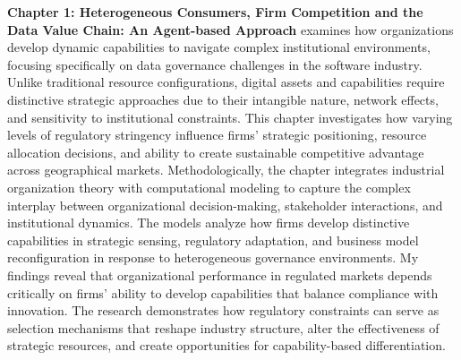 \documentclass[11pt]{article}
\begin{document}
\textbf{Chapter 1: Heterogeneous Consumers, Firm Competition and the Data Value Chain: An Agent-based Approach} examines how organizations develop dynamic capabilities to navigate complex institutional environments, focusing specifically on data governance challenges in the software industry. Unlike traditional resource configurations, digital assets and capabilities require distinctive strategic approaches due to their intangible nature, network effects, and sensitivity to institutional constraints. This chapter investigates how varying levels of regulatory stringency influence firms' strategic positioning, resource allocation decisions, and ability to create sustainable competitive advantage across geographical markets.
Methodologically, the chapter integrates industrial organization theory with computational modeling to capture the complex interplay between organizational decision-making, stakeholder interactions, and institutional dynamics. The models analyze how firms develop distinctive capabilities in strategic sensing, regulatory adaptation, and business model reconfiguration in response to heterogeneous governance environments.
My findings reveal that organizational performance in regulated markets depends critically on firms' ability to develop capabilities that balance compliance with innovation. The research demonstrates how regulatory constraints can serve as selection mechanisms that reshape industry structure, alter the effectiveness of strategic resources, and create opportunities for capability-based differentiation. 
\end{document}

